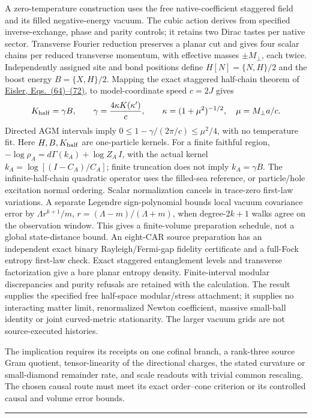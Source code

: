 A zero-temperature construction uses the free native-coefficient staggered
field and its filled negative-energy vacuum. The cubic action derives from
specified inverse-exchange, phase and parity controls; it retains two Dirac
tastes per native sector. Transverse Fourier reduction preserves a planar
cut and gives four scalar chains per reduced transverse momentum, with
effective masses \(\pm M_\perp\), each twice. Independently assigned site
and bond positions define \(H[N]=\{N,H\}/2\) and the boost energy
\(B=\{X,H\}/2\). Mapping the exact staggered half-chain theorem of
\href{https://arxiv.org/abs/2410.16433v1}{Eisler, Eqs.~(64)--(72)},
to model-coordinate speed \(c=2J\) gives
\[
 K_{\rm half}=\gamma B,\qquad
 \gamma=\frac{4\kappa K(\kappa')}{c},\qquad
 \kappa=(1+\mu^2)^{-1/2},\quad \mu=M_\perp a/c.
\]
Directed AGM intervals imply
\(0\le1-\gamma/(2\pi/c)\le\mu^2/4\), with no temperature fit.
Here \(H,B,K_{\rm half}\) are one-particle kernels. For a finite faithful
region, \(-\log\rho_A=d\Gamma(k_A)+\log Z_A\,I\), with the actual
kernel \(k_A=\log[(I-C_A)/C_A]\); finite truncation does not imply
\(k_A=\gamma B\). The infinite-half-chain quadratic operator uses the
filled-sea reference, or particle/hole excitation normal ordering.
Scalar normalization cancels in trace-zero first-law variations.
A separate Legendre sign-polynomial bounds local vacuum covariance error
by \(\Lambda r^{k+1}/m\),
\(r=(\Lambda-m)/(\Lambda+m)\), when degree-\(2k+1\) walks agree on
the observation window. This gives a finite-volume preparation schedule,
not a global state-distance bound. An eight-CAR source preparation has an
independent exact binary Rayleigh/Fermi-gap fidelity certificate and a
full-Fock entropy first-law check. Exact staggered entanglement levels and
transverse factorization give a bare planar entropy density. Finite-interval
modular discrepancies and purity refusals are retained with the calculation.
The result supplies the specified free half-space modular/stress attachment;
it supplies no interacting matter limit, renormalized Newton coefficient,
massive small-ball identity or joint curved-metric stationarity. The larger
vacuum grids are not source-executed histories.

The implication requires its receipts on one cofinal branch, a rank-three
source Gram quotient, tensor-linearity of the directional charges, the
stated curvature or small-diamond remainder rate, and scale readouts with
trivial common rescaling. The chosen causal route must meet its exact
order--cone criterion or its controlled causal and volume error bounds.

\begin{center}\rule{0.5\linewidth}{0.5pt}\end{center}
